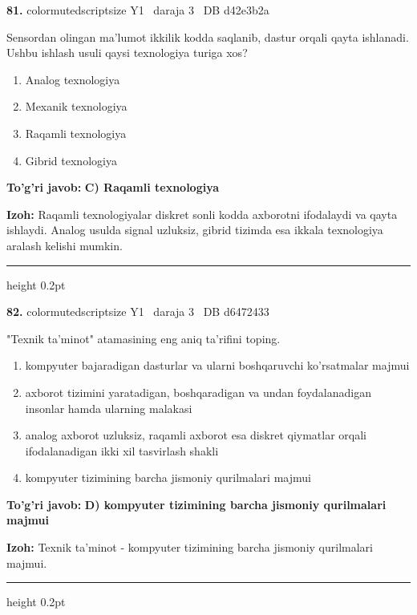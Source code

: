 \documentclass[10pt,a4paper,oneside]{article}
\begin{document}
\noindent\textbf{\color{ink}81.}  {color{muted}scriptsize Y1 \textbullet\ daraja 3 \textbullet\ DB d42e3b2a}
\par
Sensordan olingan ma'lumot ikkilik kodda saqlanib, dastur orqali qayta ishlanadi. Ushbu ishlash usuli qaysi texnologiya turiga xos?
\begin{enumerate}[label=\Alph*),leftmargin=9mm]
\item Analog texnologiya
\item Mexanik texnologiya
\item Raqamli texnologiya
\item Gibrid texnologiya
\end{enumerate}
\begin{tcolorbox}[enhanced,breakable,colback=teal!4,colframe=teal!50!black,boxrule=0.5pt,arc=1.1mm,left=3mm,right=3mm,top=1.7mm,bottom=1.7mm,before skip=2mm,after skip=2mm]
\textbf{\color{teal}To'g'ri javob:} \textbf{C) Raqamli texnologiya}
\par\smallskip
\textbf{Izoh:} Raqamli texnologiyalar diskret sonli kodda axborotni ifodalaydi va qayta ishlaydi. Analog usulda signal uzluksiz, gibrid tizimda esa ikkala texnologiya aralash kelishi mumkin.
\end{tcolorbox}
\vspace{2mm}\hrule height 0.2pt \vspace{3mm}

\noindent\textbf{\color{ink}82.}  {color{muted}scriptsize Y1 \textbullet\ daraja 3 \textbullet\ DB d6472433}
\par
"Texnik ta'minot" atamasining eng aniq ta'rifini toping.
\begin{enumerate}[label=\Alph*),leftmargin=9mm]
\item kompyuter bajaradigan dasturlar va ularni boshqaruvchi ko'rsatmalar majmui
\item axborot tizimini yaratadigan, boshqaradigan va undan foydalanadigan insonlar hamda ularning malakasi
\item analog axborot uzluksiz, raqamli axborot esa diskret qiymatlar orqali ifodalanadigan ikki xil tasvirlash shakli
\item kompyuter tizimining barcha jismoniy qurilmalari majmui
\end{enumerate}
\begin{tcolorbox}[enhanced,breakable,colback=teal!4,colframe=teal!50!black,boxrule=0.5pt,arc=1.1mm,left=3mm,right=3mm,top=1.7mm,bottom=1.7mm,before skip=2mm,after skip=2mm]
\textbf{\color{teal}To'g'ri javob:} \textbf{D) kompyuter tizimining barcha jismoniy qurilmalari majmui}
\par\smallskip
\textbf{Izoh:} Texnik ta'minot - kompyuter tizimining barcha jismoniy qurilmalari majmui.
\end{tcolorbox}
\vspace{2mm}\hrule height 0.2pt \vspace{3mm}
\end{document}
